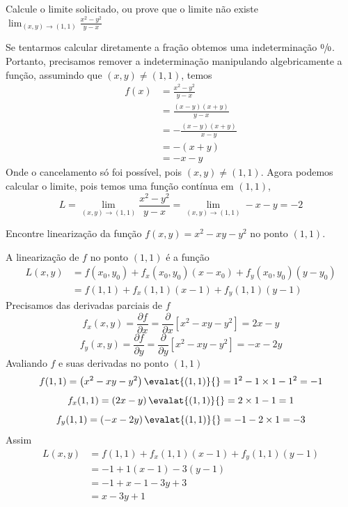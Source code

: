 \documentclass[a4paper,12pt,fleqn]{article}
\newcommand{\D}[2]{\frac{\partial {#1}}{\partial {#2}}}
\begin{document}

Calcule o limite solicitado, ou prove que o limite não existe
\(
  \lim_{(x, y)\to(1, 1)} \frac{x^2 - y^2}{y-x}
\)

\begin{answer}
  Se tentarmos calcular diretamente a fração obtemos uma
  indeterminação $\sfrac{0}{0}$.
  Portanto, precisamos remover a indeterminação manipulando
  algebricamente a função,
  assumindo que $(x, y)\neq(1, 1)$, temos
  \begin{align*}
    f(x) & = \frac{x^2 - y^2}{y-x}   \\[2mm]
         & = \frac{(x-y)(x+y)}{y-x}  \\[2mm]
         & = -\frac{(x-y)(x+y)}{x-y} \\[2mm]
         & = -(x+y)                  \\[2mm]
         & = -x-y
  \end{align*}
  Onde o cancelamento só foi possível, pois $(x, y)\neq(1, 1)$.
  Agora podemos calcular o limite, pois temos uma função contínua em $(1, 1)$,
  \[
    L
    = \lim_{(x, y)\to(1, 1)} \frac{x^2 - y^2}{y-x}
    = \lim_{(x, y)\to(1, 1)} -x-y = -2
  \]
  \clearpage
\end{answer}

Encontre linearização da função
\(
  f(x, y) = x^2 - xy - y^2
\)
no ponto \((1, 1)\).

\begin{answer}
  A linearização de $f$ no ponto \((1, 1)\) é a função
  \begin{align*}
    L(x, y)
    & = f(x_0, y_0) + f_x(x_0, y_0)(x-x_0) + f_y(x_0, y_0)(y-y_0) \\
    & = f(1, 1) + f_x(1, 1)(x-1) + f_y(1, 1)(y-1)
  \end{align*}
  Precisamos das derivadas parciais de $f$
  \[
    f_x(x, y)
    = \D{f}{x}
    = \D{}{x}\left[x^2 - xy - y^2\right]
    = 2x -y
  \]
  \[
    f_y(x, y)
    = \D{f}{y}
    = \D{}{y}\left[x^2 - xy - y^2\right]
    = -x -2y
  \]
  Avaliando $f$ e suas derivadas no ponto $(1, 1)$
  \[
    f(1, 1)
    = \left(x^2 - xy - y^2\right)\evalat{(1, 1)}{}
    = 1^2 - 1\times 1 - 1^2
    = -1
  \]
  \[
    f_x(1, 1)
    = \left(2x -y\right)\evalat{(1, 1)}{}
    = 2\times 1 - 1
    = 1
  \]
  \[
    f_y(1, 1)
    = \left(-x -2y\right)\evalat{(1, 1)}{}
    = -1 -2 \times 1
    = -3
  \]
  Assim
  \begin{align*}
    L(x, y)
    & = f(1, 1) + f_x(1, 1)(x-1) + f_y(1, 1)(y-1) \\
    & = -1 + 1(x-1) -3(y-1) \\
    & = -1 + x -1 -3y +3 \\
    & = x - 3y + 1
  \end{align*}
  \clearpage
\end{answer}
\end{document}
